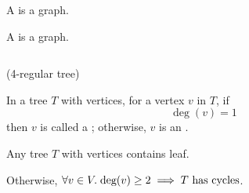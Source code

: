 
\begin{frame}{}
  \begin{definition}[Tree (树)]
    A  is a    graph.
  \end{definition}

  \pause
  \vspace{0.80cm}
  \begin{definition}[Forest (森林)]
    A  is a   graph.
  \end{definition}
\end{frame}

\begin{frame}{}
  \begin{columns}
  \end{columns}

  \pause
  \vspace{0.80cm}
\end{frame}

\begin{frame}{}
  \begin{center}
     (4-regular tree)
  \end{center}
\end{frame}

\begin{frame}{}
  \begin{definition}
    In a tree $T$ with  vertices, for a vertex $v$ in $T$, if
    \[
      \deg(v) = 1
    \]
    then $v$ is called a ;
    otherwise, $v$ is an .
  \end{definition}

  \pause
  \vspace{0.30cm}

  \pause
  \begin{lemma}
    Any tree $T$ with  vertices contains  leaf.
  \end{lemma}

  \pause
  \begin{center}
    Otherwise, $\forall v \in V.\; \text{deg}(v) \ge 2 \implies T \text{ has cycles}$.
  \end{center}
\end{frame}

